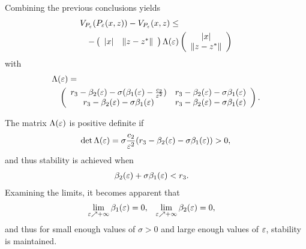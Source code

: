 \begin{frame}[t]
   {
    Combining the previous conclusions yields
    \begin{align*}
      \lefteqn{\VP(\Pe\argsxz) - \VP\argsxz \leq}\\
      &&-\left(\begin{array}{c c}
          \nzdx & \nzdzst
        \end{array}\right)
      \Le
      \left(\begin{array}{c}
          \nzdx\\
          \nzdzst
        \end{array}\right)
    \end{align*}
    with
    \begin{align*}
      \lefteqn{\Le =}\\
      &&\left(\begin{array}{c c}
          r_{3} - \bepstwo - \sigma (\bepsone - \frac{c_{2}}{\resclfparam^{2}}) & r_{3} - \bepstwo - \sigma \bepsone\\
          r_{3} - \bepstwo - \sigma \bepsone & r_{3} - \bepstwo - \sigma \bepsone
        \end{array}\right).
    \end{align*}
  }

   {
    The matrix $\Lambda(\varepsilon)$ is positive definite if
    \begin{align*}
      \det \Lambda(\varepsilon) = \sigma\frac{c_{2}}{\varepsilon^{2}} (r_{3} - \beta_{2}(\varepsilon) - \sigma \beta_{1}(\varepsilon)) > 0,
    \end{align*}
    and thus stability is achieved when
    \begin{align*}
      &\beta_{2}(\varepsilon) + \sigma \beta_{1}(\varepsilon) < r_{3}.
    \end{align*}
    Examining the limits, it becomes apparent that
    \begin{align*}
      \lim_{\varepsilon \nearrow +\infty} \beta_{1}(\varepsilon) = 0, &&\lim_{\varepsilon \nearrow +\infty} \beta_{2}(\varepsilon) &= 0,
    \end{align*}
    and thus for small enough values of $\sigma > 0$ and large enough values of
    $\varepsilon$, stability is maintained. \qedsymbol
  }
\end{frame}
